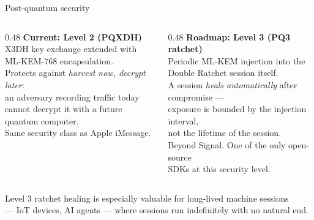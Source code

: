 \documentclass[aspectratio=169, 11pt]{beamer}
\begin{document}
\begin{frame}{Post-quantum security}
\vspace{3mm}
\begin{columns}[T]
  \begin{column}{0.48\textwidth}
    {\color{mwaccent}\textbf{Current: Level 2 (PQXDH)}}\\[4pt]
    \small
    X3DH key exchange extended with\\
    ML-KEM-768 encapsulation.\\[6pt]
    Protects against \emph{harvest now, decrypt later}:\\
    an adversary recording traffic today\\
    cannot decrypt it with a future quantum computer.\\[6pt]
    Same security class as Apple iMessage.
  \end{column}
  \begin{column}{0.48\textwidth}
    {\color{mwpurple}\textbf{Roadmap: Level 3 (PQ3 ratchet)}}\\[4pt]
    \small
    Periodic ML-KEM injection into the\\
    Double Ratchet session itself.\\[6pt]
    A session \emph{heals automatically} after compromise —\\
    exposure is bounded by the injection interval,\\
    not the lifetime of the session.\\[6pt]
    Beyond Signal. One of the only open-source\\
    SDKs at this security level.
  \end{column}
\end{columns}
\vspace{6mm}
\centering
{\small\color{mwgray}Level 3 ratchet healing is especially valuable for long-lived machine sessions\\
— IoT devices, AI agents — where sessions run indefinitely with no natural end.}
\end{frame}
\end{document}

